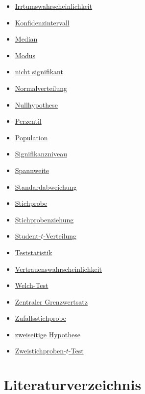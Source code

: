 \documentclass[
]{book}
\theoremstyle{definition}
\theoremstyle{definition}
\theoremstyle{definition}
\theoremstyle{definition}
\theoremstyle{remark}
\begin{document}
\begin{itemize}
  \hyperref[customdef-intervallskaliert]{intervallskaliert}
\item
  \hyperref[customdef-erring-level]{Irrtumswahrscheinlichkeit}
\item
  \hyperref[customdef-confidence-interval]{Konfidenzintervall}
\item
  \hyperref[customdef-median]{Median}
\item
  \hyperref[customdef-modus]{Modus}
\item
  \hyperref[customdef-signifikanz]{nicht signifikant}
\item
  \hyperref[customdef-normalverteilung]{Normalverteilung}
\item
  \hyperref[customdef-nullhypothese]{Nullhypothese}
\item
  \hyperref[customdef-perzentil]{Perzentil}
\item
  \hyperref[customdef-population]{Population}
\item
  \hyperref[customdef-signifikanzniveau]{Signifikanzniveau}
\item
  \hyperref[customdef-spannweite]{Spannweite}
\item
  \hyperref[customdef-std]{Standardabweichung}
\item
  \hyperref[customdef-stichprobe]{Stichprobe}
\item
  \hyperref[customdef-stichprobenziehung]{Stichprobenziehung}
\item
  \hyperref[customdef-student-verteilung]{Student-\(t\)-Verteilung}
\item
  \hyperref[customdef-teststatistik]{Teststatistik}
\item
  \hyperref[customdef-confidence-level]{Vertrauenswahrscheinlichkeit}
\item
  \hyperref[customdef-welch-test]{Welch-Test}
\item
  \hyperref[customdef-zentraler-grenzwertsatz]{Zentraler Grenzwertsatz}
\item
  \hyperref[customdef-zufallsstichprobe]{Zufallsstichprobe}
\item
  \hyperref[customdef-zweiseitige-hypothese]{zweiseitige Hypothese}
\item
  \hyperref[customdef-twosample-t-test]{Zweistichproben-\(t\)-Test}
\end{itemize}

\chapter*{Literaturverzeichnis}\label{literaturverzeichnis}

  
\end{document}
